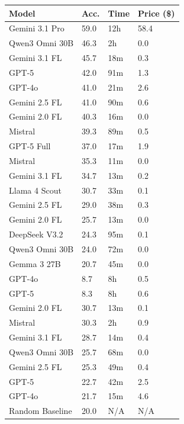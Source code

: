 \begin{tabular}{llll}
\toprule
Model & Acc. & Time & Price (\$) \\
\midrule
Gemini 3.1 Pro & 59.0 & 12h & 58.4 \\
Qwen3 Omni 30B & 46.3 & 2h & 0.0 \\
Gemini 3.1 FL & 45.7 & 18m & 0.3 \\
GPT-5 & 42.0 & 91m & 1.3 \\
GPT-4o & 41.0 & 21m & 2.6 \\
Gemini 2.5 FL & 41.0 & 90m & 0.6 \\
Gemini 2.0 FL & 40.3 & 16m & 0.0 \\
Mistral & 39.3 & 89m & 0.5 \\
GPT-5 Full & 37.0 & 17m & 1.9 \\
\midrule
Mistral & 35.3 & 11m & 0.0 \\
Gemini 3.1 FL & 34.7 & 13m & 0.2 \\
Llama 4 Scout & 30.7 & 33m & 0.1 \\
Gemini 2.5 FL & 29.0 & 38m & 0.3 \\
Gemini 2.0 FL & 25.7 & 13m & 0.0 \\
DeepSeek V3.2 & 24.3 & 95m & 0.1 \\
Qwen3 Omni 30B & 24.0 & 72m & 0.0 \\
Gemma 3 27B & 20.7 & 45m & 0.0 \\
GPT-4o & 8.7 & 8h & 0.5 \\
GPT-5 & 8.3 & 8h & 0.6 \\
\midrule
Gemini 2.0 FL & 30.7 & 13m & 0.1 \\
Mistral & 30.3 & 2h & 0.9 \\
Gemini 3.1 FL & 28.7 & 14m & 0.4 \\
Qwen3 Omni 30B & 25.7 & 68m & 0.0 \\
Gemini 2.5 FL & 25.3 & 49m & 0.4 \\
GPT-5 & 22.7 & 42m & 2.5 \\
GPT-4o & 21.7 & 15m & 4.6 \\
\midrule
Random Baseline & 20.0 & N/A & N/A \\
\bottomrule
\end{tabular}
